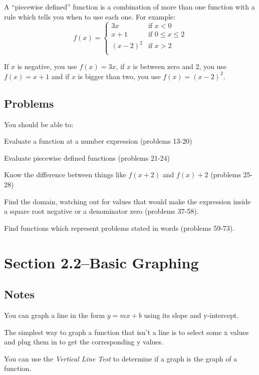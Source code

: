 \documentclass{article}
\begin{document}
A ``piecewise defined'' function is a combination of more than one function with a rule which tells you when to use each
one.  For example:
\[
  f(x) = 
    \begin{cases}
      3x        & \text{if } x < 0 \\
      x + 1     & \text{if } 0 \leq x \leq 2 \\
      (x - 2)^2 & \text{if } x > 2 \\
    \end{cases}
\]

If $x$ is negative, you use $f(x) = 3x$, if $x$ is between zero and 2, you use $f(x) = x + 1$ and if $x$ is bigger than
two, you use $f(x) = (x - 2)^2$.

\subsection{Problems}
You should be able to:
\begin{itemize*}
  \item Evaluate a function at a number expression (problems 13-20)
  \item Evaluate piecewise defined functions (problems 21-24)
  \item Know the difference between things like $f(x + 2)$ and $f(x) + 2$ (problems 25-28)
  \item Find the domain, watching out for values that would make the expression inside a square root negative or a
    denominator zero (problems 37-58).
  \item Find functions which represent problems stated in words (problems 59-73).
\end{itemize*}

\section{Section 2.2--Basic Graphing}

\subsection{Notes}

You can graph a line in the form $y = mx + b$ using its slope and y-intercept.

The simplest way to graph a function that isn't a line is to select some x values and plug them in to get the
corresponding y values.

You can use the {\em Vertical Line Test} to determine if a graph is the graph of a function.
\end{document}
